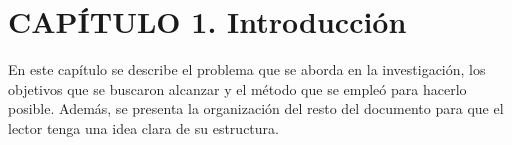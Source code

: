 \chapter*{CAPÍTULO 1. Introducción}
\setcounter{chapter}{1}
\setcounter{section}{0}
\setcounter{subsection}{0}
\setcounter{subsubsection}{0}
\setcounter{figure}{0}
\setcounter{table}{0}
\renewcommand{\thesection}{\thechapter.\arabic{section}}
\renewcommand{\thesubsection}{\thesection.\arabic{subsection}}
\renewcommand{\thesubsubsection}{\thesubsection.\arabic{subsubsection}}
\makeatletter
\protected@edef\@currentlabel{\thechapter}%
\makeatother
\label{chap:capitulo1}

En este capítulo se describe el problema que se aborda en la investigación, los objetivos que se buscaron alcanzar y el método que se empleó para hacerlo posible. Además, se presenta la organización del resto del documento para que el lector tenga una idea clara de su estructura.

